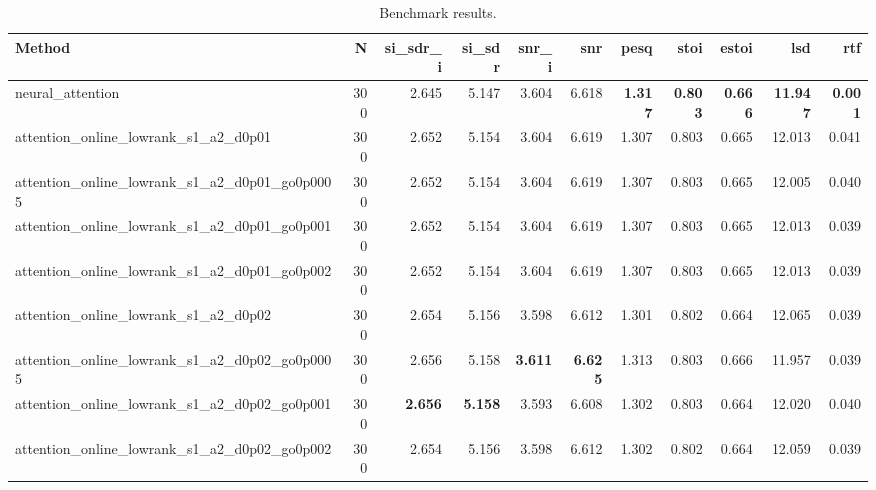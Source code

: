 \begin{table}[t]
\centering
\caption{Benchmark results.}
\label{tab:bench}
\begin{tabular}{lrrrrrrrrrr}
\toprule
Method & N & si\_sdr\_i & si\_sdr & snr\_i & snr & pesq & stoi & estoi & lsd & rtf \\
\midrule
neural_attention & 300 & 2.645 & 5.147 & 3.604 & 6.618 & \textbf{1.317} & \textbf{0.803} & \textbf{0.666} & \textbf{11.947} & \textbf{0.001} \\
attention_online_lowrank_s1_a2_d0p01 & 300 & 2.652 & 5.154 & 3.604 & 6.619 & 1.307 & 0.803 & 0.665 & 12.013 & 0.041 \\
attention_online_lowrank_s1_a2_d0p01_go0p0005 & 300 & 2.652 & 5.154 & 3.604 & 6.619 & 1.307 & 0.803 & 0.665 & 12.005 & 0.040 \\
attention_online_lowrank_s1_a2_d0p01_go0p001 & 300 & 2.652 & 5.154 & 3.604 & 6.619 & 1.307 & 0.803 & 0.665 & 12.013 & 0.039 \\
attention_online_lowrank_s1_a2_d0p01_go0p002 & 300 & 2.652 & 5.154 & 3.604 & 6.619 & 1.307 & 0.803 & 0.665 & 12.013 & 0.039 \\
attention_online_lowrank_s1_a2_d0p02 & 300 & 2.654 & 5.156 & 3.598 & 6.612 & 1.301 & 0.802 & 0.664 & 12.065 & 0.039 \\
attention_online_lowrank_s1_a2_d0p02_go0p0005 & 300 & 2.656 & 5.158 & \textbf{3.611} & \textbf{6.625} & 1.313 & 0.803 & 0.666 & 11.957 & 0.039 \\
attention_online_lowrank_s1_a2_d0p02_go0p001 & 300 & \textbf{2.656} & \textbf{5.158} & 3.593 & 6.608 & 1.302 & 0.803 & 0.664 & 12.020 & 0.040 \\
attention_online_lowrank_s1_a2_d0p02_go0p002 & 300 & 2.654 & 5.156 & 3.598 & 6.612 & 1.302 & 0.802 & 0.664 & 12.059 & 0.039 \\
\bottomrule
\end{tabular}
\end{table}